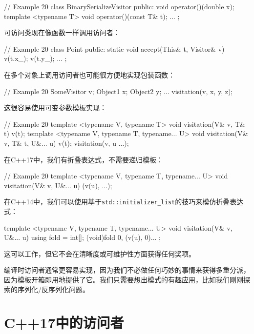 \begin{code}
{\begin{code}
// Example 20
class BinarySerializeVisitor {
  public:
  void operator()(double x);
  template <typename T> void operator()(const T& t);
  ...
};
\end{code}

可访问类现在像函数一样调用访问者：

\begin{code}
// Example 20
class Point {
  public:
  static void accept(This& t, Visitor& v) {
    v(t.x_);
    v(t.y_);
  }
  ...
};
\end{code}

在多个对象上调用访问者也可能很方便地实现包装函数：

\begin{code}
// Example 20
SomeVisitor v;
Object1 x; Object2 y; ...
visitation(v, x, y, z);
\end{code}

这很容易使用可变参数模板实现：

\begin{code}
// Example 20
template <typename V, typename T>
void visitation(V& v, T& t) {
  v(t);
}
template <typename V, typename T, typename... U>
void visitation(V& v, T& t, U&... u) {
  v(t);
  visitation(v, u ...);
}
\end{code}

在C++17中，我们有折叠表达式，不需要递归模板：

\begin{code}
// Example 20
template <typename V, typename T, typename... U>
void visitation(V& v, U&... u) {
  (v(u), ...);
}
\end{code}

在C++14中，我们可以使用基于\texttt{std::initializer\_list}的技巧来模仿折叠表达式：

\begin{code}
template <typename V, typename T, typename... U>
void visitation(V& v, U&... u) {
  using fold = int[];
  (void)fold { 0, (v(u), 0)... };
}
\end{code}

这可以工作，但它不会在清晰度或可维护性方面获得任何奖项。

编译时访问者通常更容易实现，因为我们不必做任何巧妙的事情来获得多重分派，因为模板开箱即用地提供了它。我们只需要想出模式的有趣应用，比如我们刚刚探索的序列化/反序列化问题。

\section{C++17中的访问者}

}
\end{code}
